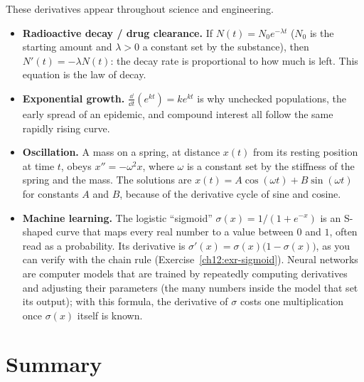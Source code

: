 \begin{applicationbox}
These derivatives appear throughout science and engineering.
\begin{itemize}
\item \textbf{Radioactive decay / drug clearance.} If $N(t)=N_0 e^{-\lambda t}$
($N_0$ is the starting amount and $\lambda>0$ a constant set by the substance),
then $N'(t) = -\lambda N(t)$: the decay rate is proportional to how much is
left. This equation is the law of decay.
\item \textbf{Exponential growth.} $\frac{\dd}{\dd t}(e^{kt})=ke^{kt}$ is why unchecked
populations, the early spread of an epidemic, and compound interest all follow
the same rapidly rising curve.
\item \textbf{Oscillation.} A mass on a spring, at distance $x(t)$ from its
resting position at time $t$, obeys $x''=-\omega^2 x$, where $\omega$ is a
constant set by the stiffness of the spring and the mass. The solutions are
$x(t)=A\cos(\omega t)+B\sin(\omega t)$ for constants $A$ and $B$, because of the
derivative cycle of sine and cosine.
\item \textbf{Machine learning.} The logistic ``sigmoid''
$\sigma(x)=1/(1+e^{-x})$ is an S-shaped curve that maps every real number to a
value between $0$ and $1$, often read as a probability. Its derivative is
$\sigma'(x)=\sigma(x)\big(1-\sigma(x)\big)$, as you can verify with the chain
rule (Exercise~\ref{ch12:exr-sigmoid}). Neural networks are computer models
that are trained by repeatedly computing derivatives and adjusting their
parameters (the many numbers inside the model that set its output); with this formula, the derivative of $\sigma$ costs one
multiplication once $\sigma(x)$ itself is known.
\end{itemize}
\end{applicationbox}

\section{Summary}
\label{ch12:summary}

